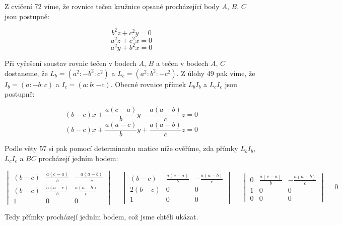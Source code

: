 \documentclass{fkssolpub}
\author{Ondřej Sedláček}
\begin{document}
 

Z cvičení 72 víme, že rovnice tečen kružnice opsané procházející body
$A$, $B$, $C$ jsou postupně:

\[
  b^2 z + c^2 y = 0
\]
\[
  a^2 z + c^2 x = 0
\]
\[
  a^2 y + b^2 x = 0
\]

Při vyřešení soustav rovnic tečen v bodech $A$, $B$ a tečen v bodech
$A$, $C$ dostaneme, že $L_b = (a^2 : -b^2 : c^2)$ a $L_c = (a^2 : b^2 : -c^2)$.
Z úlohy 49 pak víme, že $I_b = (a : -b : c)$ a $I_c = (a : b : -c)$. Obecné
rovnice přímek $L_bI_b$ a $L_cI_c$ jsou postupně:

\[
  (b - c) x + \frac{a (c - a)}{b} y - \frac{a (a - b)}{c} z = 0
\]
\[
  (b - c) x + \frac{a (a - c)}{b} y + \frac{a (a - b)}{c} z = 0
\]

Podle věty 57 si pak pomocí determinantu matice níže ověříme, zda přímky
$L_bI_b$, $L_cI_c$ a $BC$ procházejí jedním bodem:

\[
\begin{vmatrix}
  (b - c) & \frac{a (c - a)}{b} & -\frac{a (a - b)}{c} \\
  (b - c) & \frac{a (a - c)}{b} & \frac{a (a - b)}{c} \\
  1 & 0 & 0
\end{vmatrix} = 
\begin{vmatrix}
  (b - c) & \frac{a (c - a)}{b} & - \frac{a (a - b)}{c} \\
  2(b - c) & 0 & 0 \\
  1 & 0 & 0
\end{vmatrix} = 
\begin{vmatrix}
  0 & \frac{a (c - a)}{b} & - \frac{a (a - b)}{c} \\
  1 & 0 & 0 \\
  0 & 0 & 0
\end{vmatrix} = 0
\]

Tedy přímky procházejí jedním bodem, což jsme chtěli ukázat.
\end{document}
